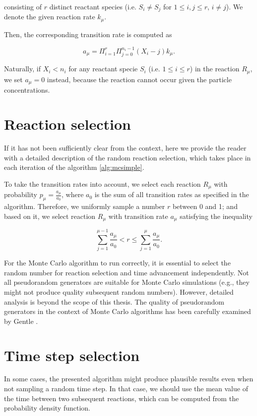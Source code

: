 consisting of $r$ distinct reactant species (i.e. $S_i \neq S_j$ for $1 \leq i, j \leq r$, $i \neq j$). We denote the given reaction rate $k_\mu$.

Then, the corresponding transition rate is computed as 

$$
a_\mu = \Pi_{i=1}^{r} \Pi_{j = 0}^{n_i - 1} \left( X_i - j \right) k_\mu.
$$

Naturally, if $X_i < n_i$ for any reactant specie $S_i$ (i.e. $1 \leq i \leq r$) in the reaction $R_\mu$, we set $a_\mu = 0$ instead, because the reaction cannot occur given the particle concentrations.


\section{Reaction selection}

If it has not been sufficiently clear from the context, here we provide the reader with a detailed description of the random reaction selection, which takes place in each iteration of the algorithm \ref{alg:mcsimple}. 

To take the transition rates into account, we select each reaction $R_\mu$ with probability $p_\mu = \frac{a_\mu}{a_0}$, where $a_0$ is the sum of all transition rates as specified in the algorithm. Therefore, we uniformly sample a number $r$ between 0 and 1; and based on it, we select reaction $R_\mu$ with transition rate $a_\mu$ satisfying the inequality 

$$
\sum_{j = 1}^{\mu - 1}\frac{a_\mu}{a_0} < r \leq \sum_{j = 1}^{\mu}\frac{a_\mu}{a_0}.
$$ 

For the Monte Carlo algorithm to run correctly, it is essential to select the random number for reaction selection and time advancement independently. Not all pseudorandom generators are suitable for Monte Carlo simulations (e.g., they might not produce quality subsequent random numbers). However, detailed analysis is beyond the scope of this thesis. The quality of pseudorandom generators in the context of Monte Carlo algorithms has been carefully examined by Gentle \cite{random}. 

\section{Time step selection}

In some cases, the presented algorithm might produce plausible results even when not sampling a random time step. In that case, we should use the mean value of the time between two subsequent reactions, which can be computed from the probability density function. 

